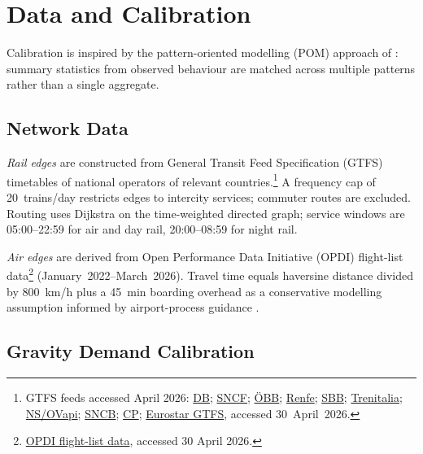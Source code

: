 \documentclass[12pt,a4paper]{article}
\begin{document}
\section{Data and Calibration}
\label{sec:calibration}

Calibration is inspired by the pattern-oriented modelling (POM) approach of \citet{Grimm2005}:
summary statistics from observed behaviour are matched across multiple patterns rather
than a single aggregate.

\subsection{Network Data}

\emph{Rail edges} are constructed from General Transit Feed Specification (GTFS) timetables of national operators of relevant countries.\footnote{GTFS feeds accessed April 2026:
  \href{https://www.gtfs.de/en/feeds/de_fv/}{DB};
  \href{https://transport.data.gouv.fr/datasets/horaires-sncf}{SNCF};
  \href{https://data.oebb.at/de/datensaetze~soll-fahrplan-gtfs~}{\"{O}BB};
  \href{https://nap.transportes.gob.es/Files/Detail/897}{Renfe};
  \href{https://archive.opentransportdata.swiss/timetable_gtfs_archive.htm}{SBB};
  \href{https://www.cciss.it/nap/mmtis/public/en/catalog/Asset/204135}{Trenitalia};
  \href{https://gtfs.ovapi.nl/nl/gtfs-nl.zip}{NS/OVapi};
  \href{https://data.belgianmobility.io/en/data.html}{SNCB};
  \href{https://www.transit.land/feeds/f-eyc-cp}{CP};
  \href{https://transport.data.gouv.fr/datasets/eurostar-gtfs-plan-de-transport-et-temps-reel}{Eurostar GTFS}, accessed 30~April~2026.}
A frequency cap of 20~trains/day restricts edges to intercity services; commuter routes
are excluded.
Routing uses Dijkstra on the time-weighted directed graph; service windows are 05:00--22:59 for air and day rail, 20:00--08:59 for night rail.

\emph{Air edges} are derived from Open Performance Data Initiative (OPDI) flight-list
data\footnote{\href{https://www.opdi.aero/flight-list-data}{OPDI flight-list data}, accessed 30 April 2026.}
(January~2022--March~2026).
Travel time equals haversine distance divided by 800~km/h \citep{ESPON2013} plus
a 45~min boarding overhead as a conservative modelling assumption informed by airport-process guidance \citep{IATA2023}.
\subsection{Gravity Demand Calibration}
\end{document}

